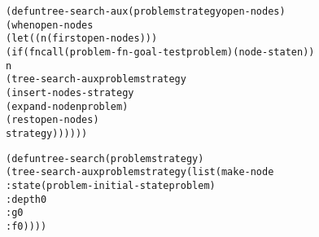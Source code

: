 \begin{aibox}{\code}
\begin{alltt}
(defun tree-search-aux (problem strategy open-nodes)
    (when open-nodes
        (let ((n (first open-nodes)))
            (if (fncall (problem-fn-goal-test problem) (node-state n))
              n
              (tree-search-aux problem strategy  
                    (insert-nodes-strategy 
                        (expand-node n problem)
                        (rest open-nodes)
                        strategy))))))

(defun tree-search (problem strategy)
  (tree-search-aux problem strategy (list (make-node
                                          :state (problem-initial-state problem)
                                          :depth 0
                                          :g 0
                                          :f 0))))

\end{alltt}
\end{aibox}
